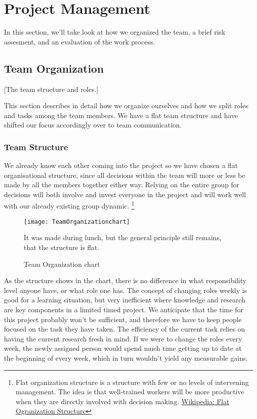 \section{Project Management}\label{Project Management} 
    In this section, we'll take look at how we organized the team, a brief risk assesment, and an evaluation of the work process. 
    
    \subsection{Team Organization}\label{Team Organization} 
        [The team structure and roles.]
        
        This section describes in detail how we organize ourselves and how we split roles and tasks among the team members. We have a flat team structure and have shifted our focus accordingly over to team communication. 
    
    \subsubsection{Team Structure}\label{Team Structure}
    We already know each other coming into the project so we have chosen a flat organisational structure, since all decisions within the team will more or less be made by all the members together either way. Relying on the entire group for decisions will both involve and invest everyone in the project and will work well with our already existing group dynamic.
    \footnote{
        Flat organization structure is a structure with few or no levels of intervening management. The idea is that well-trained workers will be more productive when they are directly involved with decision making. 
        \href{http://en.wikipedia.org/wiki/Flat_organization}{Wikipedia: Flat Ogranization Structure} 
    }
    
    \begin{figure}[h]
        \centering
        \texttt{[image: TeamOrganizationchart]}
        \caption{Team Organization chart}
        It was made during lunch, but the general principle still remains, that the structure is flat.
        \label{fig:TeamOrganizationchart}
    \end{figure}
    
    As the structure shows in the chart, there is no difference in what responsibility level anyone have, or what role one has. The concept of changing roles weekly is good for a learning situation, but very inefficient where knowledge and research are key components in a limited timed project. We anticipate that the time for this project probably won't be sufficient, and therefore we have to keep people focused on the task they have taken. The efficiency of the current task relies on having the current research fresh in mind. If we were to change the roles every week, the newly assigned person would spend much time getting up to date at the beginning of every week, which in turn wouldn't yield any measurable gains. 

